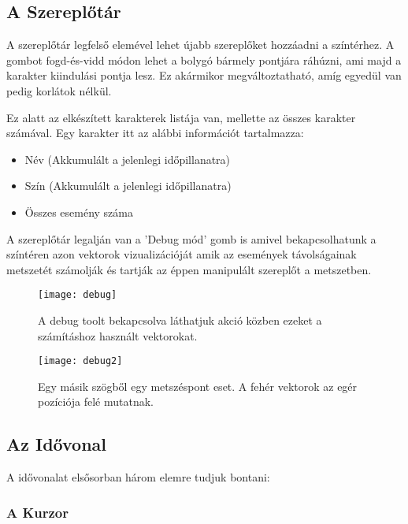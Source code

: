 \subsection{A Szereplőtár} \label{section:ui-actor-tool}

A szereplőtár legfelső elemével lehet újabb szereplőket hozzáadni a színtérhez. A gombot fogd-és-vidd módon lehet a bolygó bármely pontjára ráhúzni, ami majd a karakter kiindulási pontja lesz. Ez akármikor megváltoztatható, amíg egyedül van pedig korlátok nélkül.

Ez alatt az elkészített karakterek listája van, mellette az összes karakter számával. Egy karakter itt az alábbi információt tartalmazza:

\begin{itemize}
	\item Név (Akkumulált a jelenlegi időpillanatra)
	\item Szín (Akkumulált a jelenlegi időpillanatra)
	\item Összes esemény száma
\end{itemize}

A szereplőtár legalján van a 'Debug mód' gomb is amivel bekapcsolhatunk a színtéren azon vektorok vizualizációját amik az események távolságainak metszetét számolják és tartják az éppen manipulált szereplőt a metszetben.

\begin{figure}[h!]
	\centering
	\texttt{[image: debug]}
	\caption{A debug toolt bekapcsolva láthatjuk akció közben ezeket a számításhoz használt vektorokat.}
	\label{fig:debug}
\end{figure}
\begin{figure}[h!]
	\centering
	\texttt{[image: debug2]}
	\caption{Egy másik szögből egy metszéspont eset. A fehér vektorok az egér pozíciója felé mutatnak.}
	\label{fig:debug2}
\end{figure}




\pagebreak
\subsection{Az Idővonal} \label{section:ui-timeline}

A idővonalat elsősorban három elemre tudjuk bontani:

\subsubsection{A Kurzor}

